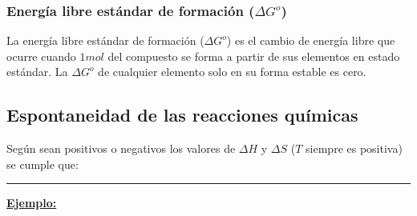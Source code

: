             \subsubsection{Energía libre estándar de formación ($\Delta G^o$)}
            \sangria{} La energía libre estándar de formación ($\Delta G^o$) es el cambio de energía libre que ocurre cuando $1mol$ del compuesto se forma a partir de sus elementos en estado estándar.
            La $\Delta G^o$ de cualquier elemento solo en su forma estable es cero.
    \subsection{Espontaneidad de las reacciones químicas}
        \sangria{} Según sean positivos o negativos los valores de $\Delta H$ y $\Delta S$ ($T$ siempre es positiva) se cumple que:
        \rule{8cm}{0.05mm}
        \textbf{\underline{Ejemplo:}}
